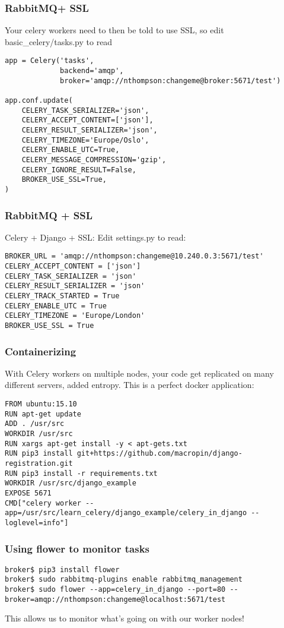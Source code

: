 \documentclass[9pt]{beamer}
\begin{document}
\begin{frame}[fragile]
\frametitle{RabbitMQ+ SSL}
Your celery workers need to then be told to use SSL, so edit basic\_celery/tasks.py to read
\begin{verbatim}
app = Celery('tasks',
             backend='amqp',
             broker='amqp://nthompson:changeme@broker:5671/test')

app.conf.update(
    CELERY_TASK_SERIALIZER='json',
    CELERY_ACCEPT_CONTENT=['json'],
    CELERY_RESULT_SERIALIZER='json',
    CELERY_TIMEZONE='Europe/Oslo',
    CELERY_ENABLE_UTC=True,
    CELERY_MESSAGE_COMPRESSION='gzip',
    CELERY_IGNORE_RESULT=False,
    BROKER_USE_SSL=True,
)
\end{verbatim}
\end{frame}

\begin{frame}[fragile]
\frametitle{RabbitMQ + SSL}
Celery + Django + SSL: Edit settings.py to read:
\begin{verbatim}
BROKER_URL = 'amqp://nthompson:changeme@10.240.0.3:5671/test'
CELERY_ACCEPT_CONTENT = ['json']
CELERY_TASK_SERIALIZER = 'json'
CELERY_RESULT_SERIALIZER = 'json'
CELERY_TRACK_STARTED = True
CELERY_ENABLE_UTC = True
CELERY_TIMEZONE = 'Europe/London'
BROKER_USE_SSL = True
\end{verbatim}
\end{frame}

\begin{frame}[fragile]
\frametitle{Containerizing}
With Celery workers on multiple nodes, your code get replicated on many different servers, added entropy. This is a perfect docker application:
\begin{verbatim}
FROM ubuntu:15.10
RUN apt-get update
ADD . /usr/src
WORKDIR /usr/src
RUN xargs apt-get install -y < apt-gets.txt
RUN pip3 install git+https://github.com/macropin/django-registration.git
RUN pip3 install -r requirements.txt
WORKDIR /usr/src/django_example
EXPOSE 5671
CMD["celery worker --app=/usr/src/learn_celery/django_example/celery_in_django --loglevel=info"]
\end{verbatim}
\end{frame}

\begin{frame}[fragile]
\frametitle{Using flower to monitor tasks}
\begin{verbatim}
broker$ pip3 install flower
broker$ sudo rabbitmq-plugins enable rabbitmq_management
broker$ sudo flower --app=celery_in_django --port=80 --broker=amqp://nthompson:changeme@localhost:5671/test 
\end{verbatim}
This allows us to monitor what's going on with our worker nodes!
\end{frame}
\end{document}
